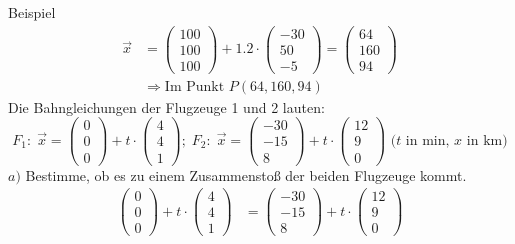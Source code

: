 \documentclass{article}
\begin{document}
\begin{boxx}[DarkBlue]{Beispiel}
\begin{align*}
                \vec{x} &= \begin{pmatrix}100\\100\\100\end{pmatrix} + 1.2 \cdot \begin{pmatrix}-30\\50\\-5\end{pmatrix} = \begin{pmatrix}64\\160\\94\end{pmatrix} \\
                &\Rightarrow \text{Im Punkt } P(64,160,94)
            \end{align*}
        Die Bahngleichungen der Flugzeuge 1 und 2 lauten:
        \[F_1:\; \vec{x} = \begin{pmatrix}0\\0\\0\end{pmatrix} + t \cdot \begin{pmatrix}4\\4\\1\end{pmatrix};\; F_2:\; \vec{x} = \begin{pmatrix}-30\\-15\\8\end{pmatrix} + t \cdot \begin{pmatrix}12\\9\\0\end{pmatrix}\text{ ($t$ in $\unit{\minute}$, $x$ in $\unit{\kilo\meter}$)}\]
        $a)$\hspace{3mm} Bestimme, ob es zu einem Zusammenstoß der beiden Flugzeuge kommt.
        \begin{align*}
            \begin{pmatrix}0\\0\\0\end{pmatrix} + t \cdot \begin{pmatrix}4\\4\\1\end{pmatrix} &=  \begin{pmatrix}-30\\-15\\8\end{pmatrix} + t \cdot \begin{pmatrix}12\\9\\0\end{pmatrix} \\

\end{align*}
\end{boxx}
\end{document}
